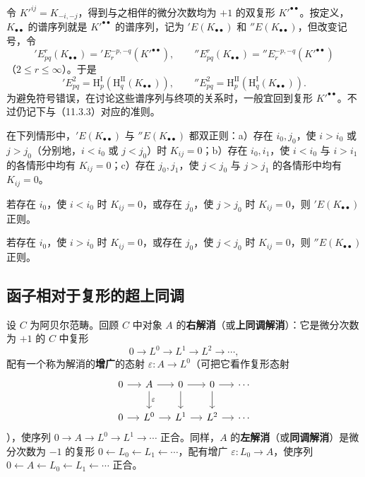 令 $K'^{ij}=K_{-i,-j}$，得到与之相伴的微分次数均为 $+1$ 的双复形 $K'^{\bullet\bullet}$。按定义，$K_{\bullet\bullet}$ 的谱序列就是 $K'^{\bullet\bullet}$ 的谱序列，记为 $'E(K_{\bullet\bullet})$ 和 $''E(K_{\bullet\bullet})$，但改变记号，令
\[
'E^r_{pq}(K_{\bullet\bullet})='E_r^{-p,-q}(K'^{\bullet\bullet}),\qquad
''E^r_{pq}(K_{\bullet\bullet})=''E_r^{-p,-q}(K'^{\bullet\bullet})
\]
（$2\leq r\leq\infty$）。于是
\[
'E^2_{pq}=\mathrm H_p^{\mathrm I}(\mathrm H_q^{\mathrm{II}}(K_{\bullet\bullet})),\qquad
''E^2_{pq}=\mathrm H_p^{\mathrm{II}}(\mathrm H_q^{\mathrm I}(K_{\bullet\bullet})).
\]
为避免符号错误，在讨论这些谱序列与终项的关系时，一般宜回到复形 $K'^{\bullet\bullet}$。不过仍记下与（11.3.3）对应的准则。

在下列情形中，$'E(K_{\bullet\bullet})$ 与 $''E(K_{\bullet\bullet})$ 都双正则：a）存在 $i_0,j_0$，使 $i>i_0$ 或 $j>j_0$（分别地，$i<i_0$ 或 $j<j_0$）时 $K_{ij}=0$；b）存在 $i_0,i_1$，使 $i<i_0$ 与 $i>i_1$ 的各情形中均有 $K_{ij}=0$；c）存在 $j_0,j_1$，使 $j<j_0$ 与 $j>j_1$ 的各情形中均有 $K_{ij}=0$。

若存在 $i_0$，使 $i<i_0$ 时 $K_{ij}=0$，或存在 $j_0$，使 $j>j_0$ 时 $K_{ij}=0$，则 $'E(K_{\bullet\bullet})$ 正则。

若存在 $i_0$，使 $i>i_0$ 时 $K_{ij}=0$，或存在 $j_0$，使 $j<j_0$ 时 $K_{ij}=0$，则 $''E(K_{\bullet\bullet})$ 正则。\par

\subsection{函子相对于复形的超上同调}
设 $C$ 为阿贝尔范畴。回顾 $C$ 中对象 $A$ 的\textbf{右解消}（或\textbf{上同调解消}）：它是微分次数为 $+1$ 的 $C$ 中复形
\[
0\longrightarrow L^0\longrightarrow L^1\longrightarrow L^2\longrightarrow\cdots,
\]
配有一个称为解消的\textbf{增广}的态射 $\varepsilon:A\to L^0$（可把它看作复形态射
\[
\begin{tikzcd}[column sep=small]
0\arrow[r]&A\arrow[r]\arrow[d,"\varepsilon"]&0\arrow[r]\arrow[d]&0\arrow[r]\arrow[d]&\cdots\\
0\arrow[r]&L^0\arrow[r]&L^1\arrow[r]&L^2\arrow[r]&\cdots
\end{tikzcd}
\]
），使序列 $0\to A\to L^0\to L^1\to\cdots$ 正合。同样，$A$ 的\textbf{左解消}（或\textbf{同调解消}）是微分次数为 $-1$ 的复形 $0\leftarrow L_0\leftarrow L_1\leftarrow\cdots$，配有增广 $\varepsilon:L_0\to A$，使序列 $0\leftarrow A\leftarrow L_0\leftarrow L_1\leftarrow\cdots$ 正合。

